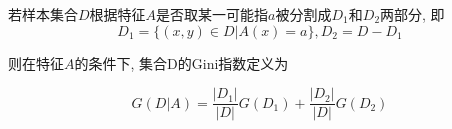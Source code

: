 \begin{remark}
    若样本集合$D$根据特征$A$是否取某一可能指$a$被分割成$D_1$和$D_2$两部分, 即
    \begin{equation*}
        D_1=\{(x,y)\in D| A(x) = a\}, D_2 = D - D_1
    \end{equation*}

    则在特征$A$的条件下, 集合D的Gini指数定义为

    \begin{equation}\label{gini_binary}
        G(D|A) = \frac{|D_1|}{|D|}G(D_1) + \frac{|D_2|}{|D|}G(D_2)
    \end{equation}
\end{remark}